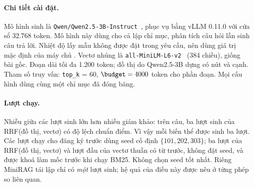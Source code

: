 \paragraph{Chi tiết cài đặt.}
Mô hình sinh là \texttt{Qwen/Qwen2.5-3B-Instruct}~\cite{qwen2025qwen25}, phục vụ bằng vLLM 0.11.0 với cửa sổ 32.768 token. Mô hình này dùng cho cả lập chỉ mục, phân tích câu hỏi lẫn sinh câu trả lời.
Nhiệt độ lấy mẫu không được đặt trong yêu cầu, nên dùng giá trị mặc định của máy chủ .
Vectơ nhúng là \texttt{all-MiniLM-L6-v2}~\cite{reimers2019sbert,wang2020minilm} (384 chiều), giống bài gốc.
Đoạn dài tối đa 1.200 token; đồ thị do Qwen2.5-3B dựng có \graphNodes{} nút và \graphEdges{} cạnh.
Tham số truy vấn: \texttt{top\_k} = 60, $\budget = 4000$ token cho phần đoạn.
Mọi cấu hình dùng cùng một chỉ mục đã đóng băng.

\paragraph{Lượt chạy.}
Nhiễu giữa các lượt sinh lớn hơn nhiễu giám khảo: trên \nHeld{} câu, ba lượt sinh của RRF(đồ thị, vectơ) có độ lệch chuẩn \sdGenGV{} điểm.
Vì vậy mỗi biến thể được sinh ba lượt. Các lượt chạy cho đăng ký trước dùng seed cố định $\{101, 202, 303\}$; ba lượt của RRF(đồ thị, vectơ) và lượt đầu của vectơ thuần có từ trước, không đặt seed, và được khoá làm mốc trước khi chạy BM25. Không chọn seed tốt nhất.
Riêng MiniRAG tái lập chỉ có \emph{một} lượt sinh; hệ quả của điều này được nêu ở từng phép so liên quan.

